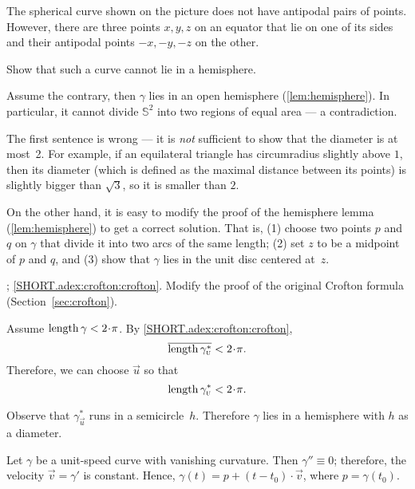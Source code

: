 \begin{multicols}{2}
The spherical curve shown on the picture does not have antipodal pairs of points.
However, there are three points $x,y,z$ on an equator that lie on one of its sides and their antipodal points $-x,-y,-z$ on the other.

Show that such a curve cannot lie in a hemisphere.

Assume the contrary, then $\gamma$ lies in an open hemisphere (\ref{lem:hemisphere}).
In particular, it cannot divide $\mathbb{S}^2$ into two regions of equal area --- a contradiction.

The first sentence is wrong --- it is \textit{not} sufficient to show that the diameter is at most~2.
For example, if an equilateral triangle has circumradius slightly above $1$,
then its diameter (which is defined as the maximal distance between its points) is slightly bigger than $\sqrt3$, so it is smaller than $2$.

On the other hand, it is easy to modify the proof of the hemisphere lemma (\ref{lem:hemisphere}) to get a correct solution.
That is, (1) choose two points $p$ and $q$ on $\gamma$ that divide it into two arcs of the same length;
(2) set $z$ to be a midpoint of $p$ and $q$,
and (3) show that $\gamma$ lies in the unit disc centered at~$z$.


\parbf{\ref{adex:crofton}}; \ref{SHORT.adex:crofton:crofton}.
Modify the proof of the original Crofton formula
(Section~\ref{sec:crofton}).

Assume $\length \gamma<2\cdot\pi$.
By \ref{SHORT.adex:crofton:crofton},
\[\overline{\length \gamma^*_{\vec u}}<2\cdot\pi.\]
Therefore, we can choose ${\vec u}$ so that 
\[\length \gamma^*_{\vec u}<2\cdot\pi.\]

Observe that $\gamma^*_{\vec u}$ runs in a semicircle~$h$.
Therefore $\gamma$ lies in a hemisphere with $h$ as a diameter.


\setcounter{eqtn}{0}


Let $\gamma$ be a unit-speed curve with vanishing curvature.
Then $\gamma''\equiv 0$; therefore, the velocity $\vec v=\gamma'$ is constant.
Hence, $\gamma(t)=p+(t-t_0)\cdot \vec v$, where $p=\gamma(t_0)$.



\end{multicols}
